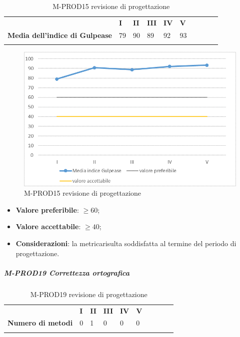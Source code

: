 \begin{longtable} {						
		>{}p{70mm}  		
		>{}p{8mm}		
		>{}p{8mm}		
		>{}p{8mm}		
		>{}p{8mm}		
		>{}p{8mm}		
		>{}p{8mm}
		>{}p{8mm}
		>{}p{8mm}
		>{}p{8mm}				
	}			
	\rowcolor{gray!50}
	\textbf{} & \textbf{I} & \textbf{II} & \textbf{III} & \textbf{IV} & \textbf{V} \TBstrut \\ [2mm]
	\textbf{Media dell'indice di Gulpease} & 79 & 90 & 89 & 92 & 93 \TBstrut \\ [2mm]
	\rowcolor{white}
	\caption{M-PROD15 revisione di progettazione\glo}
\end{longtable}
\begin{figure}[H] 	
	\includegraphics[width=\linewidth]{./img/grafici/RP20.png}	
	\caption{M-PROD15 revisione di progettazione\glo}	
\end{figure}
\begin{itemize}
	\item \textbf{Valore preferibile}: $\ge60$;
	\item \textbf{Valore accettabile}: $\ge40$;
	\item \textbf{Considerazioni}: la metrica\glosp risulta soddisfatta al termine del periodo di progettazione\glo.
\end{itemize}
\subparagraph{M-PROD19 Correttezza ortografica} \mbox{}
\begin{longtable}[H!] {						
		>{}p{50mm}  		
		>{}p{8mm}
		>{}p{8mm}		
		>{}p{8mm}		
		>{}p{8mm}		
		>{}p{8mm}		
		>{}p{8mm}
		>{}p{8mm}
		>{}p{8mm}
		>{}p{8mm}
	}
	\rowcolor{gray!50}
	\textbf{} & \textbf{I} & \textbf{II} & \textbf{III} & \textbf{IV} & \textbf{V} \TBstrut \\ [2mm]
	\textbf{Numero di metodi} & 0 & 1 & 0 & 0 & 0 \TBstrut \\ [2mm]
	\rowcolor{white}
	\caption{M-PROD19 revisione di progettazione\glo}
\end{longtable}
